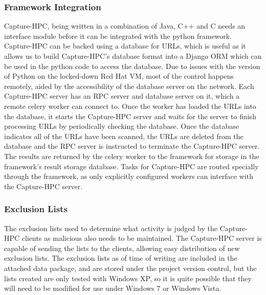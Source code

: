 \subsubsection{Framework Integration}

Capture-HPC, being written in a combination of Java, C++ and C needs an
interface module before it can be integrated with the python framework.
Capture-HPC can be backed using a database for URLs, which is useful as it
allows us to build Capture-HPC's database format into a Django ORM which can
be used in the python code to access the database. Due to issues with the
version of Python on the locked-down Red Hat VM, most of the control happens
remotely, aided by the accessibility of the database server on the network. Each
Capture-HPC server has an RPC server and database server on it, which a remote
celery worker can connect to. Once the worker has loaded the URLs into the
database, it starts the Capture-HPC server and waits for the server to finish
processing URLs by periodically checking the database. Once the database
indicates all of the URLs have been scanned, the URLs are deleted from the
database and the RPC server is instructed to terminate the Capture-HPC server.
The results are returned by the celery worker to the framework for storage in
the framework's result storage database. Tasks for Capture-HPC are routed
specially through the framework, as only explicitly configured workers can
interface with the Capture-HPC server.

\subsubsection{Exclusion Lists}

The exclusion lists used to determine what activity is judged by the Capture-HPC
clients as malicious also needs to be maintained. The Capture-HPC server is
capable of sending the lists to the clients, allowing easy distribution of new
exclusion lists. The exclusion lists as of time of writing are included in
the attached data package, and are stored under the project version control, but the lists
created are only tested with Windows XP, so it is quite possible that they will
need to be modified for use under Windows 7 or Windows Vista.

